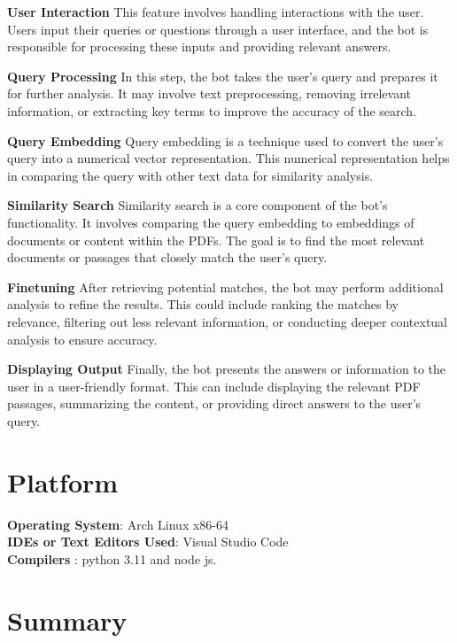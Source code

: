 \documentclass[11pt]{article}
\begin{document}
\textbf{User Interaction} This feature involves handling interactions with the user. Users input their queries or questions through a user interface, and the bot is responsible for processing these inputs and providing relevant answers.

\textbf{Query Processing} In this step, the bot takes the user's query and prepares it for further analysis. It may involve text preprocessing, removing irrelevant information, or extracting key terms to improve the accuracy of the search.

\textbf{Query Embedding} Query embedding is a technique used to convert the user's query into a numerical vector representation. This numerical representation helps in comparing the query with other text data for similarity analysis.

\textbf{Similarity Search} Similarity search is a core component of the bot's functionality. It involves comparing the query embedding to embeddings of documents or content within the PDFs. The goal is to find the most relevant documents or passages that closely match the user's query.

\textbf{Finetuning} After retrieving potential matches, the bot may perform additional analysis to refine the results. This could include ranking the matches by relevance, filtering out less relevant information, or conducting deeper contextual analysis to ensure accuracy.

\textbf{Displaying Output} Finally, the bot presents the answers or information to the user in a user-friendly format. This can include displaying the relevant PDF passages, summarizing the content, or providing direct answers to the user's query.

\section{Platform}
\textbf{Operating System}: Arch Linux x86-64 \\
\textbf{IDEs or Text Editors Used}: Visual Studio Code\\
\textbf{Compilers} : python 3.11 and node js. \\

\section{Summary}
\end{document}
